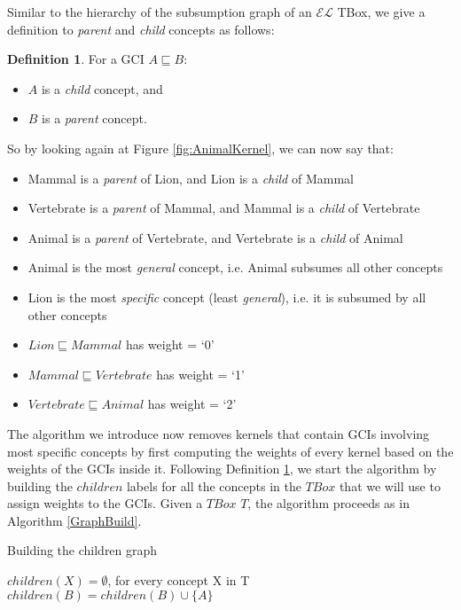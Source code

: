 \documentclass{sfuthesis}
\theoremstyle{plain}
\theoremstyle{definition}
\newtheorem{defn}[thm]{Definition}
\begin{document}
Similar to the hierarchy of the subsumption graph of an $\mathcal{EL}$ TBox, we give a definition to \textit{parent} and \textit{child} concepts as follows:
\begin{defn}
\label{defn:Parent-Child}
For a GCI $A \sqsubseteq B$:
\begin{itemize}
\item $A$ is a \textit{child} concept, and
\item $B$ is a \textit{parent} concept.\\
\end{itemize}
\end{defn}

So by looking again at Figure \ref{fig:AnimalKernel}, we can now say that:
\begin{itemize}
\item Mammal is a \textit{parent} of Lion, and Lion is a \textit{child} of Mammal
\item Vertebrate is a \textit{parent} of Mammal, and Mammal is a \textit{child} of Vertebrate
\item Animal is a \textit{parent} of Vertebrate, and Vertebrate is a \textit{child} of Animal
\item Animal is the most \textit{general} concept, i.e. Animal subsumes all other concepts
\item Lion is the most \textit{specific} concept (least \textit{general}), i.e. it is subsumed by all other concepts
\item $Lion \sqsubseteq Mammal$ has weight = `0'
\item $Mammal \sqsubseteq Vertebrate$ has weight = `1'
\item $Vertebrate \sqsubseteq Animal$ has weight = `2'
\end{itemize}

The algorithm we introduce now removes kernels that contain GCIs involving most specific concepts by first computing the weights of every kernel based on the weights of the GCIs inside it. Following Definition \ref{defn:Parent-Child}, we start the algorithm by building the $children$ labels for all the concepts in the $TBox$ that we will use to assign weights to the GCIs. Given a $TBox$ $T$, the algorithm proceeds as in Algorithm \ref{GraphBuild}.

\begin{algorithm}
\caption{Building the children graph}
\label{GraphBuild}
\begin{algorithmic}[1]
\State $children(X) = \emptyset$, for every concept X in T 
\State $children(B) = children(B) \cup \{ A \}$
\EndFor
\EndFunction
\end{algorithmic}
\end{algorithm}
\end{document}
